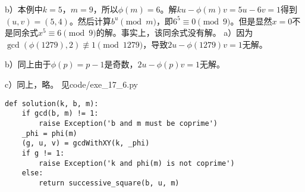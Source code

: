 b）本例中$k=5$，$m=9$，所以$\phi(m)=6$。解$ku-\phi(m)v=5u-6v=1$得到$(u,v)=(5,4)$。然后计算$b^u\pmod m$，即$6^5\equiv 0\pmod 9$。但是显然$x=0$不是同余式$x^5\equiv6\pmod9$的解。事实上，该同余式没有解。
%
\exercise a）因为$\gcd(\phi(1279), 2)\not\equiv1\pmod 1279$，导致$2u-\phi(1279)v=1$无解。\par
b）同上由于$\phi(p)=p-1$是奇数，$2u-\phi(p)v=1$无解。\par
c）同上，略。
%
\exercise 见code/exe\_17\_6.py
\begin{lstlisting}
def solution(k, b, m):
    if gcd(b, m) != 1:
        raise Exception('b and m must be coprime')
    _phi = phi(m)
    (g, u, v) = gcdWithXY(k, _phi)
    if g != 1:
        raise Exception('k and phi(m) is not coprime')
    else:
        return successive_square(b, u, m)
\end{lstlisting}